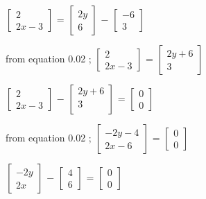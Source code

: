\documentclass[journal,12pt,twocolumn]{IEEEtran}
\theoremstyle{remark}
\numberwithin{equation}{subsection}
\begin{document}
      \vspace{1cm}
      $\begin{bmatrix}
        2 \\
        2x-3
      \end{bmatrix}$
      =  $\begin{bmatrix}
        2y \\
        6
      \end{bmatrix}$
      $-$ $\begin{bmatrix}
        -6 \\
         3
      \end{bmatrix}$
      
       \vspace{1cm}
       from equation 0.02 ;
     $\begin{bmatrix}
        2 \\
        2x-3
      \end{bmatrix}$
      =  $\begin{bmatrix}
        2y+6 \\
        3
      \end{bmatrix}$ 
      
      \vspace{1cm}
    $\begin{bmatrix}
        2 \\
        2x-3
      \end{bmatrix}$
    $-$  $\begin{bmatrix}
        2y+6 \\
        3 \\
      \end{bmatrix}$ =
       $\begin{bmatrix}
        0 \\
        0
      \end{bmatrix}$ 
      
      \vspace{1cm}
       from equation 0.02 ;
     $\begin{bmatrix}
        -2y-4 \\
         2x-6
      \end{bmatrix}$
      =  $\begin{bmatrix}
        0 \\
        0
      \end{bmatrix}$ 
      
      \vspace{1cm}
      $\begin{bmatrix}
        -2y \\
         2x
      \end{bmatrix}$
    $-$  $\begin{bmatrix}
         4 \\
         6
      \end{bmatrix}$ =
       $\begin{bmatrix}
        0 \\
        0
      \end{bmatrix}$ 
      
\end{document}
